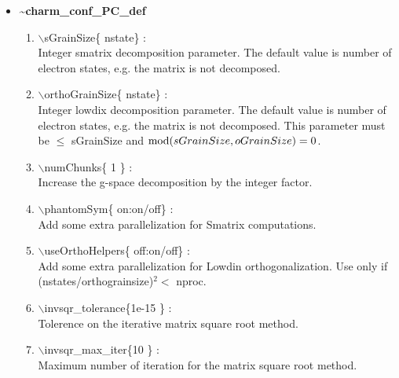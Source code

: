 \begin{itemize}
\clearpage
\huge
\item[] {\bf \~{ }charm\_conf\_PC\_def}
\begin{enumerate}
  \vspace{0.15in} \Large
  \item $\backslash$sGrainSize\{ nstate\} : \\    \large
  Integer smatrix decomposition parameter. The default value is number of
  electron states, e.g. the matrix is not decomposed.
  \vspace{0.15in} \Large
  \item $\backslash$orthoGrainSize\{ nstate\} : \\    \large
  Integer lowdix decomposition parameter. The default value is number of
  electron states, e.g. the matrix is not decomposed. This parameter
  must be $\leq$ sGrainSize and ${\rm mod}(sGrainSize,oGrainSize)=0$.
  \vspace{0.15in} \Large
  \item $\backslash$numChunks\{ 1 \} : \\    \large
  Increase the g-space decomposition by the integer factor.
  \vspace{0.15in} \Large
  \item $\backslash$phantomSym\{ on:on/off\} : \\    \large
  Add some extra parallelization for Smatrix computations.
  \vspace{0.15in} \Large
  \item $\backslash$useOrthoHelpers\{ off:on/off\} : \\    \large
  Add some extra parallelization for Lowdin orthogonalization.
  Use only if (nstates/orthograinsize)$^2<$ nproc.
  \vspace{0.15in} \Large
  \item $\backslash$invsqr\_tolerance\{1e-15 \} : \\    \large
  Tolerence on the iterative matrix square root method.
  \vspace{0.15in} \Large
  \item $\backslash$invsqr\_max\_iter\{10 \} : \\    \large
  Maximum number of iteration for the matrix square root method.
\end{enumerate}


\end{itemize}
